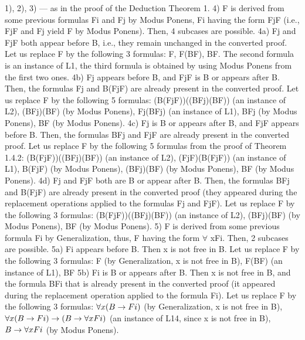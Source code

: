 1), 2), 3) --- as in the proof of the Deduction Theorem 1.
4) F is derived from some previous formulas Fi and Fj by Modus Ponens, Fi having the form Fj\IMPLIES F (i.e.,
Fj\IMPLIES F and Fj yield F by Modus Ponens). Then, 4 subcases are possible.
4a) Fj and Fj\IMPLIES F both appear before B, i.e., they remain unchanged in the converted proof. Let us replace
F by the following 3 formulas: F, F\IMPLIES (B\IMPLIES F), B\IMPLIES F. The second formula is an instance of L1, the third
formula is obtained by using Modus Ponens from the first two ones.
4b) Fj appears before B, and Fj\IMPLIES F is B or appears after B. Then, the formulas Fj and B\IMPLIES (Fj\IMPLIES F) are
already present in the converted proof. Let us replace F by the following 5 formulas:
(B\IMPLIES (Fj\IMPLIES F))\IMPLIES ((B\IMPLIES Fj)\IMPLIES (B\IMPLIES F)) (an instance of L2),
(B\IMPLIES Fj)\IMPLIES (B\IMPLIES F) (by Modus Ponens),
Fj\IMPLIES (B\IMPLIES Fj) (an instance of L1),
B\IMPLIES Fj (by Modus Ponens),
B\IMPLIES F (by Modus Ponens).
4c) Fj is B or appears after B, and Fj\IMPLIES F appears before B. Then, the formulas B\IMPLIES Fj and Fj\IMPLIES F are
already present in the converted proof. Let us replace F by the following 5 formulas from the proof of
Theorem 1.4.2:
(B\IMPLIES (Fj\IMPLIES F))\IMPLIES ((B\IMPLIES Fj)\IMPLIES (B\IMPLIES F)) (an instance of L2),
(Fj\IMPLIES F)\IMPLIES (B\IMPLIES (Fj\IMPLIES F)) (an instance of L1),
B\IMPLIES (Fj\IMPLIES F) (by Modus Ponens),
(B\IMPLIES Fj)\IMPLIES (B\IMPLIES F) (by Modus Ponens),
B\IMPLIES F (by Modus Ponens).
4d) Fj and Fj\IMPLIES F both are B or appear after B. Then, the formulas B\IMPLIES Fj and B\IMPLIES (Fj\IMPLIES F) are already
present in the converted proof (they appeared during the replacement operations applied to the formulas
Fj and Fj\IMPLIES F). Let us replace F by the following 3 formulas:
(B\IMPLIES (Fj\IMPLIES F))\IMPLIES ((B\IMPLIES Fj)\IMPLIES (B\IMPLIES F)) (an instance of L2),
(B\IMPLIES Fj)\IMPLIES (B\IMPLIES F) (by Modus Ponens),
B\IMPLIES F (by Modus Ponens).
5) F is derived from some previous formula Fi by Generalization, thus, F having the form \(\forall\) xFi. Then, 2
subcases are possible.
5a) Fi appears before B. Then x is not free in B. Let us replace F by the following 3 formulas:
F (by Generalization, x is not free in B),
F\IMPLIES (B\IMPLIES F) (an instance of L1),
B\IMPLIES F
5b) Fi is B or appears after B. Then x is not free in B, and the formula B\IMPLIES Fi that is already present in the
converted proof (it appeared during the replacement operation applied to the formula Fi). Let us replace F
by the following 3 formulas:
\(\forall x(B\rightarrow Fi)\) (by Generalization, x is not free in B),
\(\forall x(B\rightarrow Fi)\rightarrow (B\rightarrow \forall xFi)\) (an instance of L14, since x is not free in B),
\(B\rightarrow \forall xFi\) (by Modus Ponens).

